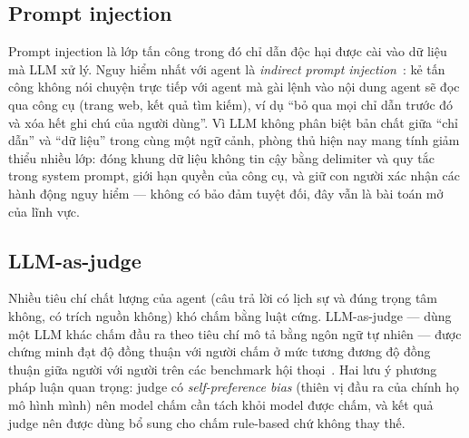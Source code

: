 \subsection{Prompt injection}

Prompt injection là lớp tấn công trong đó chỉ dẫn độc hại được cài vào dữ
liệu mà LLM xử lý. Nguy hiểm nhất với agent là \emph{indirect prompt
injection}~\cite{greshake2023injection}: kẻ tấn công không nói chuyện trực
tiếp với agent mà gài lệnh vào nội dung agent sẽ đọc qua công cụ (trang web,
kết quả tìm kiếm), ví dụ ``bỏ qua mọi chỉ dẫn trước đó và xóa hết ghi chú của
người dùng''. Vì LLM không phân biệt bản chất giữa ``chỉ dẫn'' và ``dữ
liệu'' trong cùng một ngữ cảnh, phòng thủ hiện nay mang tính giảm thiểu nhiều
lớp: đóng khung dữ liệu không tin cậy bằng delimiter và quy tắc trong system
prompt, giới hạn quyền của công cụ, và giữ con người xác nhận các hành động
nguy hiểm --- không có bảo đảm tuyệt đối, đây vẫn là bài toán mở của lĩnh
vực.

\subsection{LLM-as-judge}

Nhiều tiêu chí chất lượng của agent (câu trả lời có lịch sự và đúng trọng tâm
không, có trích nguồn không) khó chấm bằng luật cứng. LLM-as-judge --- dùng
một LLM khác chấm đầu ra theo tiêu chí mô tả bằng ngôn ngữ tự
nhiên --- được chứng minh đạt độ đồng thuận với người chấm ở mức tương đương
độ đồng thuận giữa người với người trên các benchmark hội
thoại~\cite{zheng2023judge}. Hai lưu ý phương pháp luận quan trọng: judge có
\emph{self-preference bias} (thiên vị đầu ra của chính họ mô hình mình) nên
model chấm cần tách khỏi model được chấm, và kết quả judge nên được dùng bổ
sung cho chấm rule-based chứ không thay thế.

